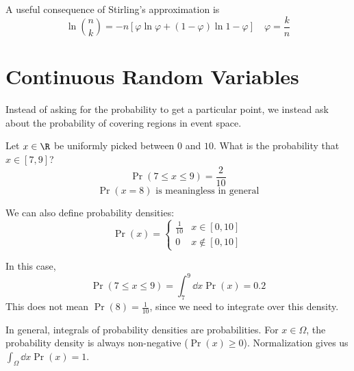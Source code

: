 \documentclass[a4paper,twoside,master.tex]{subfiles}
\begin{document}

A useful consequence of Stirling's approximation is
\begin{equation}
    \ln{\binom{n}{k}} = -n\left[ \varphi \ln{\varphi} + (1 - \varphi) \ln{1 - \varphi} \right] \quad \varphi = \frac{k}{n}
\end{equation}

\section{Continuous Random Variables}
\label{sec:continuous_random_variables}

Instead of asking for the probability to get a particular point, we instead ask about the probability of covering regions in event space.

\begin{ex}
    Let $ x \in \R $ be uniformly picked between $ 0 $ and $ 10 $. What is the probability that $ x \in \left[ 7,9 \right] $?
    \begin{equation}
        \Pr(7 \leq x \leq 9) = \frac{2}{10}
    \end{equation}
    \begin{equation}
        \Pr(x = 8) \text{ is meaningless in general}
    \end{equation}

    We can also define probability densities:
    \begin{equation}
        \Pr(x) = \begin{cases} \frac{1}{10} & x \in \left[ 0, 10 \right] \\ 0 & x \notin \left[ 0, 10 \right] \end{cases}
    \end{equation}

    In this case,
    \begin{equation}
        \Pr(7 \leq x \leq 9) = \int_7^9 \dd{x} \Pr(x) = 0.2
    \end{equation}
    This does not mean $ \Pr(8) = \frac{1}{10} $, since we need to integrate over this density.
\end{ex}

In general, integrals of probability densities are probabilities. For $ x \in \Omega $, the probability density is always non-negative ($ \Pr(x) \geq 0 $). Normalization gives us $ \int_{\Omega} \dd{x} \Pr(x) = 1 $.
\end{document}
